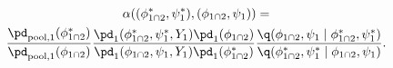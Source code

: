\begin{multline}
  \alpha((\phi_{1 \cap 2}^{*}, \psi_{1}^{*}), (\phi_{1 \cap 2}, \psi_{1})) = \\
  \frac {
    \pd_{\text{pool}, 1}(\phi_{1 \cap 2}^{*})
  } {
    \pd_{\text{pool}, 1}(\phi_{1 \cap 2})
  }
  \frac {
    \pd_{1}(\phi_{1 \cap 2}^{*}, \psi_{1}^{*}, Y_{1})
    \pd_{1}(\phi_{1 \cap 2})
  } {
    \pd_{1}(\phi_{1 \cap 2}, \psi_{1}, Y_{1})
    \pd_{1}(\phi_{1 \cap 2}^{*})
  }
  \frac {
    \q(\phi_{1 \cap 2}, \psi_{1} \mid \phi_{1 \cap 2}^{*}, \psi_{1}^{*})
  } {
    \q(\phi_{1 \cap 2}^{*}, \psi_{1}^{*} \mid \phi_{1 \cap 2}, \psi_{1})
  }.
  \label{eqn:stage-one-acceptance-probability}
\end{multline}